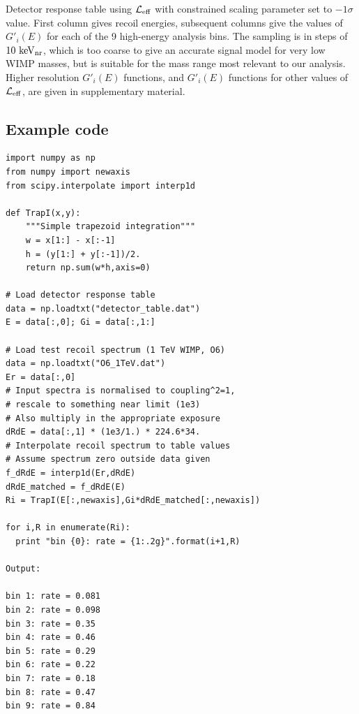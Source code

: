 \begin{table}
{
  \lstset{tabsize=4,basicstyle=\tiny\ttfamily,columns=flexible,emptylines=10000,keepspaces=true}
  
}
\caption{Detector response table using $\mathcal{L}_{\mathrm{eff}}$ with constrained scaling parameter set to $-1\sigma$ value. First column gives recoil energies, subsequent columns give the values of $G'_i(E)$ for each of the 9 high-energy analysis bins. The sampling is in steps of $10~\mathrm{keV_\mathrm{nr}}$, which is too coarse to give an accurate signal model for very low WIMP masses, but is suitable for the mass range most relevant to our analysis. Higher resolution $G'_i(E)$ functions, and $G'_i(E)$ functions for other values of $\mathcal{L}_{\mathrm{eff}}$, are given in supplementary material. 
\label{tab:smeartable_highE}
}
\end{table}  
\subsection{Example code}
\label{app:example_code}
\begin{lstlisting}
import numpy as np
from numpy import newaxis
from scipy.interpolate import interp1d

def TrapI(x,y):
    """Simple trapezoid integration"""
    w = x[1:] - x[:-1]
    h = (y[1:] + y[:-1])/2.
    return np.sum(w*h,axis=0)

# Load detector response table
data = np.loadtxt("detector_table.dat")
E = data[:,0]; Gi = data[:,1:]

# Load test recoil spectrum (1 TeV WIMP, O6)
data = np.loadtxt("O6_1TeV.dat")
Er = data[:,0]
# Input spectra is normalised to coupling^2=1,
# rescale to something near limit (1e3)
# Also multiply in the appropriate exposure
dRdE = data[:,1] * (1e3/1.) * 224.6*34.
# Interpolate recoil spectrum to table values
# Assume spectrum zero outside data given
f_dRdE = interp1d(Er,dRdE)
dRdE_matched = f_dRdE(E)
Ri = TrapI(E[:,newaxis],Gi*dRdE_matched[:,newaxis])

for i,R in enumerate(Ri):
  print "bin {0}: rate = {1:.2g}".format(i+1,R)

Output:

bin 1: rate = 0.081
bin 2: rate = 0.098
bin 3: rate = 0.35
bin 4: rate = 0.46
bin 5: rate = 0.29
bin 6: rate = 0.22
bin 7: rate = 0.18
bin 8: rate = 0.47
bin 9: rate = 0.84
\end{lstlisting}


